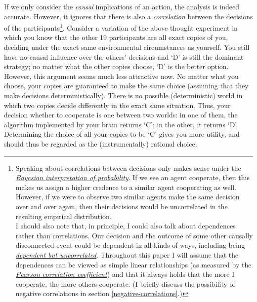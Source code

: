If we only consider the \emph{causal} implications of an action, the
analysis is indeed accurate. However, it ignores that there is also a
\emph{correlation} between the decisions of the participants\footnote{Speaking
  about correlations between decisions only makes sense under the
  \href{https://en.wikipedia.org/wiki/Bayesian_probability}{\emph{Bayesian
  interpretation of probability}}. If we see an agent cooperate, then
  this makes us assign a higher credence to a similar agent cooperating
  as well. However, if we were to observe two similar agents make the
  same decision over and over again, then their decisions would be
  uncorrelated in the resulting empirical
  distribution.\\[2\baselineskip]I should also note that, in principle,
  I could also talk about dependences rather than correlations. Our
  decision and the outcome of some other causally disconnected event
  could be dependent in all kinds of ways, including being
  \href{https://stats.stackexchange.com/questions/179511/why-zero-correlation-does-not-necessarily-imply-independence}{\emph{dependent
  but uncorrelated}}. Throughout this paper I will assume that the
  dependences can be viewed as simple linear relationships (as measured
  by the
  \href{https://en.wikipedia.org/wiki/Pearson_correlation_coefficient}{\emph{Pearson
  correlation coefficient}}) and that it always holds that the more I
  cooperate, the more others cooperate. (I briefly discuss the
  possibility of negative correlations in section
  \ref{negative-correlations}.)}. Consider a variation of the above thought
experiment in which you know that the other 19 participants are all
exact copies of you, deciding under the exact same environmental
circumstances as yourself. You still have no causal influence over the
others' decisions and `D' is still the dominant strategy; no matter what
the other copies choose, `D' is the better option. However, this
argument seems much less attractive now. No matter what you choose, your
copies are guaranteed to make the same choice (assuming that they make
decisions deterministically). There is no possible (deterministic) world
in which two copies decide differently in the exact same situation.
Thus, your decision whether to cooperate is one between two worlds: in
one of them, the algorithm implemented by your brain returns `C'; in the
other, it returns `D'. Determining the choice of all your copies to be
`C' gives you more utility, and should thus be regarded as the
(instrumentally) rational choice.

